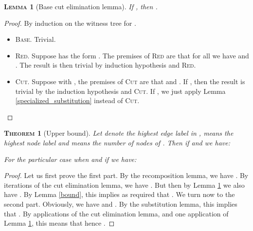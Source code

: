 \documentclass{article}
\newtheorem{lemma}{\textsc{Lemma}}
\newtheorem{theorem}{\textsc{Theorem}}
\begin{document}
\begin{lemma}[Base cut elimination lemma]
If , then .
\label{specialized_cut_elim}
\end{lemma}
\begin{proof}
By induction on the witness tree for .
\begin{itemize}
\item \textsc{Base.} Trivial.
\item \textsc{Red.} Suppose  has the form . The premises of \textsc{Red} are that for all  we have
 and . The result is then
trivial by induction hypothesis and \textsc{Red}.
\item \textsc{Cut.} Suppose  with , the premises of \textsc{Cut} are that  and . If , then the result
is trivial by the induction hypothesis and \textsc{Cut}. If , we just apply Lemma \ref{specialized_substitution} instead of \textsc{Cut}.
\end{itemize}
\end{proof}

\begin{theorem}[Upper bound]
Let  denote the highest edge label in ,  means the highest node label and  means the number of nodes of . Then if  and  we have:

For the particular case when  and if  we have:

\end{theorem}
\begin{proof}
Let us first prove the first part. By the recomposition lemma, we have . By  iterations of the cut elimination lemma, we have
. But then by Lemma \ref{specialized_cut_elim} we also have . By Lemma \ref{bound}, this
implies as required that . We turn now to the second part. Obviously, we have  and . By the
substitution lemma, this implies that . By  applications of the cut elimination lemma, and one application of Lemma \ref{specialized_cut_elim}, this means
that  hence .
\end{proof}
\end{document}
